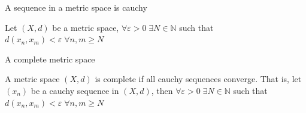 \documentclass[a4paper,norsk]{article}
\renewcommand{\geq}{\geqslant}
\renewcommand{\epsilon}{\varepsilon}
\begin{document}
\begin{oppgavebox}{A sequence in a metric space is cauchy}{}
\begin{proofbox}{}{}
  Let $ \left( X, d \right)  $ be a metric space, $ \forall \epsilon > 0 \; \exists N \in \mathbb{N} $ such that $ d \left( x_n, x_m \right) < \epsilon \; \forall n, m  \geq N $ 
\end{proofbox}
\end{oppgavebox}

\begin{oppgavebox}{A complete metric space}{}
\begin{proofbox}{}{}
  A metric space $ \left( X,d \right)  $ is complete if all cauchy sequences converge. That is, let $ \left( x_n \right)  $ be a cauchy sequence in $ \left( X, d \right)  $, then   $ \forall \epsilon > 0 \; \exists  N \in \mathbb{N} $ such that $ d \left( x_n, x_m \right) < \epsilon \; \forall n, m \geq N $ 
\end{proofbox}
\end{oppgavebox}
\end{document}
